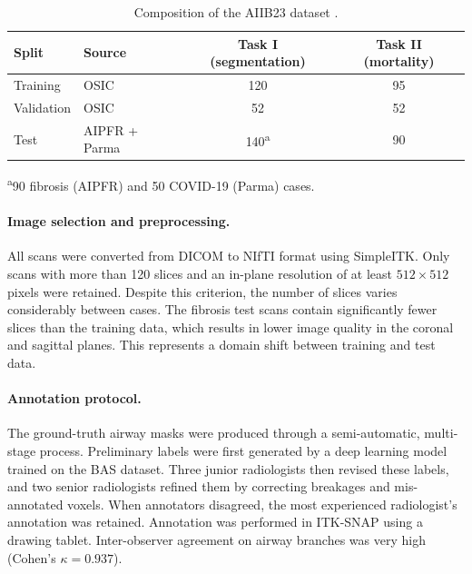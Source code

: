 \begin{table}[htbp]  %
  \centering  %
  \caption{Composition of the AIIB23 dataset \cite{nan2024aiib23}.}  %
  \label{tab:aiib23_splits}  %
  \begin{tabular}{llcc}  %
    \toprule  %
    Split & Source & Task I (segmentation) & Task II (mortality) \\
    \midrule  %
    Training   & OSIC          & 120 & 95 \\
    Validation & OSIC          & 52  & 52 \\
    Test       & AIPFR + Parma & 140\textsuperscript{a} & 90 \\
    \bottomrule  %
  \end{tabular}

  \smallskip  %
  {\footnotesize \textsuperscript{a}90 fibrosis (AIPFR) and 50 COVID-19 (Parma) cases.}  %
\end{table}

\paragraph{Image selection and preprocessing.}  %
All scans were converted from DICOM to NIfTI format using SimpleITK. Only
scans with more than 120 slices and an in-plane resolution of at least
$512 \times 512$ pixels were retained. Despite this criterion, the number of
slices varies considerably between cases. The fibrosis test scans contain
significantly fewer slices than the training data, which results in lower
image quality in the coronal and sagittal planes. This represents a domain
shift between training and test data.

\paragraph{Annotation protocol.}  %
The ground-truth airway masks were produced through a semi-automatic,
multi-stage process. Preliminary labels were first generated by a deep
learning model trained on the BAS dataset. Three junior radiologists then
revised these labels, and two senior radiologists refined them by correcting
breakages and mis-annotated voxels. When annotators disagreed, the most
experienced radiologist's annotation was retained. Annotation was performed in
ITK-SNAP using a drawing tablet. Inter-observer agreement on airway branches
was very high (Cohen's $\kappa = 0.937$).

